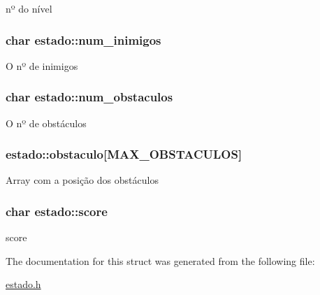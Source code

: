 nº do nível \hypertarget{structestado_a6fbc4a80c4f371036f264ecfe27e5f9e}{
\subsubsection[{num\+\_\+inimigos}]{\setlength{\rightskip}{0pt plus 5cm}char estado\+::num\+\_\+inimigos}}\label{structestado_a6fbc4a80c4f371036f264ecfe27e5f9e}
O nº de inimigos \hypertarget{structestado_ac1a8a541e2301189833c6f713c416063}{
\subsubsection[{num\+\_\+obstaculos}]{\setlength{\rightskip}{0pt plus 5cm}char estado\+::num\+\_\+obstaculos}}\label{structestado_ac1a8a541e2301189833c6f713c416063}
O nº de obstáculos \hypertarget{structestado_a970dc20c6687acb17c3f08c06edbed4f}{
\subsubsection[{obstaculo}]{ estado\+::obstaculo\mbox{[}{\bf M\+A\+X\+\_\+\+O\+B\+S\+T\+A\+C\+U\+L\+O\+S}\mbox{]}}}\label{structestado_a970dc20c6687acb17c3f08c06edbed4f}
Array com a posição dos obstáculos \hypertarget{structestado_a312d7aee47aeea05c30f01ff16fa8679}{
\subsubsection[{score}]{\setlength{\rightskip}{0pt plus 5cm}char estado\+::score}}\label{structestado_a312d7aee47aeea05c30f01ff16fa8679}
score 

The documentation for this struct was generated from the following file\+:\begin{DoxyCompactItemize}
\item 
\hyperlink{estado_8h}{estado.\+h}\end{DoxyCompactItemize}
